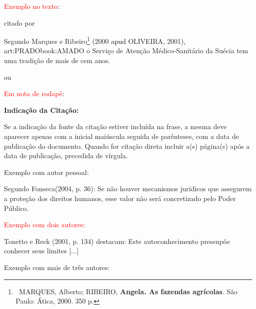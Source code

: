 \bigskip

{\sffamily
	\textrm{\textcolor{red}{Exemplo no texto}}\textrm{:}}

\bigskip

{\sffamily
	\textrm{citado por }}

\bigskip

{\sffamily
	\textrm{Segundo Marques e Ribeiro}\footnote{\ MARQUES, Alberto;
		RIBEIRO, \textbf{Angela. As fazendas agrícolas}. São
		Paulo: Ática, 2000. 350 p.}\textrm{ (2000
	}\textrm{\textcolor{black}{apud }}\textrm{OLIVEIRA, 2001), \apudonline
		{art:PRADO}{book:AMADO} o Serviço de
		Atenção Médico-Sanitário da Suécia tem uma tradição de mais de
		cem anos. }}

\bigskip

{\color{red}
	ou}

{\sffamily
	\textrm{\textcolor{red}{Em nota de rodapé}}\textrm{:}}

\bigskip

{\centering\bfseries\color{red}
	Indicação da Citação:
	\par}

\bigskip

{\sffamily
	\textrm{Se a indicação da fonte da citação estiver incluída na frase, a
		mesma deve aparecer apenas com a inicial
		maiúscula seguida de parênteses, com a data de publicação do
	}\textrm{documento. Quando for citação direta incluir a(s)
		página(s) após a data de publicação, precedida de vírgula.}}

\bigskip

{\color{red}
	Exemplo com autor pessoal:}

\bigskip

Segundo Fonseca(2004, p. 36): {\textquotedbl}Se não houver mecanismos jurídicos
que assegurem a proteção dos direitos
humanos, esse valor não será concretizado pelo Poder Público.{\textquotedbl}\\

\bigskip

{\sffamily
	\textrm{\textcolor{red}{Exemplo com dois autores: }}}

\bigskip

Tonetto e Reck (2001, p. 134) destacam: {\textquotedbl}Este autoconhecimento
pressupõe conhecer seus limites
	[...]{\textquotedbl} \\

\bigskip

{\color{red}
	Exemplo com mais de três autores:}

\bigskip

